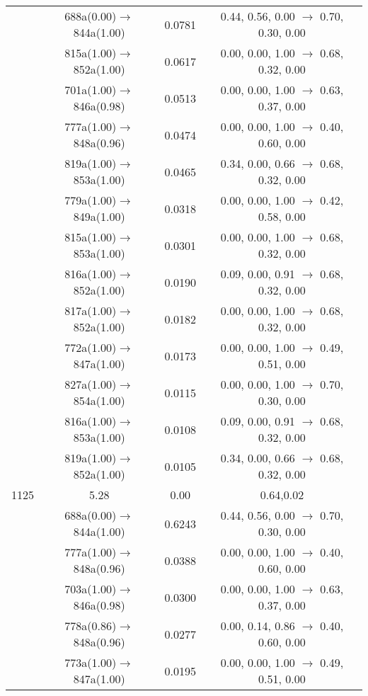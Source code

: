 \documentclass[10pt,a4paper]{article}
\begin{document}
\begin{longtable}{c|c|c|c}
 	& 688a(0.00)$\rightarrow$844a(1.00) &	 0.0781 &	 0.44, 0.56, 0.00 $\rightarrow$ 0.70, 0.30, 0.00 \\ 
 	& 815a(1.00)$\rightarrow$852a(1.00) &	 0.0617 &	 0.00, 0.00, 1.00 $\rightarrow$ 0.68, 0.32, 0.00 \\ 
 	& 701a(1.00)$\rightarrow$846a(0.98) &	 0.0513 &	 0.00, 0.00, 1.00 $\rightarrow$ 0.63, 0.37, 0.00 \\ 
 	& 777a(1.00)$\rightarrow$848a(0.96) &	 0.0474 &	 0.00, 0.00, 1.00 $\rightarrow$ 0.40, 0.60, 0.00 \\ 
 	& 819a(1.00)$\rightarrow$853a(1.00) &	 0.0465 &	 0.34, 0.00, 0.66 $\rightarrow$ 0.68, 0.32, 0.00 \\ 
 	& 779a(1.00)$\rightarrow$849a(1.00) &	 0.0318 &	 0.00, 0.00, 1.00 $\rightarrow$ 0.42, 0.58, 0.00 \\ 
 	& 815a(1.00)$\rightarrow$853a(1.00) &	 0.0301 &	 0.00, 0.00, 1.00 $\rightarrow$ 0.68, 0.32, 0.00 \\ 
 	& 816a(1.00)$\rightarrow$852a(1.00) &	 0.0190 &	 0.09, 0.00, 0.91 $\rightarrow$ 0.68, 0.32, 0.00 \\ 
 	& 817a(1.00)$\rightarrow$852a(1.00) &	 0.0182 &	 0.00, 0.00, 1.00 $\rightarrow$ 0.68, 0.32, 0.00 \\ 
 	& 772a(1.00)$\rightarrow$847a(1.00) &	 0.0173 &	 0.00, 0.00, 1.00 $\rightarrow$ 0.49, 0.51, 0.00 \\ 
 	& 827a(1.00)$\rightarrow$854a(1.00) &	 0.0115 &	 0.00, 0.00, 1.00 $\rightarrow$ 0.70, 0.30, 0.00 \\ 
 	& 816a(1.00)$\rightarrow$853a(1.00) &	 0.0108 &	 0.09, 0.00, 0.91 $\rightarrow$ 0.68, 0.32, 0.00 \\ 
 	& 819a(1.00)$\rightarrow$852a(1.00) &	 0.0105 &	 0.34, 0.00, 0.66 $\rightarrow$ 0.68, 0.32, 0.00 \\ 
 \hline1125 &	 5.28 &	 0.00 &	 0.64,0.02 \\ 
  	& 688a(0.00)$\rightarrow$844a(1.00) &	 0.6243 &	 0.44, 0.56, 0.00 $\rightarrow$ 0.70, 0.30, 0.00 \\ 
 	& 777a(1.00)$\rightarrow$848a(0.96) &	 0.0388 &	 0.00, 0.00, 1.00 $\rightarrow$ 0.40, 0.60, 0.00 \\ 
 	& 703a(1.00)$\rightarrow$846a(0.98) &	 0.0300 &	 0.00, 0.00, 1.00 $\rightarrow$ 0.63, 0.37, 0.00 \\ 
 	& 778a(0.86)$\rightarrow$848a(0.96) &	 0.0277 &	 0.00, 0.14, 0.86 $\rightarrow$ 0.40, 0.60, 0.00 \\ 
 	& 773a(1.00)$\rightarrow$847a(1.00) &	 0.0195 &	 0.00, 0.00, 1.00 $\rightarrow$ 0.49, 0.51, 0.00 \\ 

\end{longtable}
\end{document}
